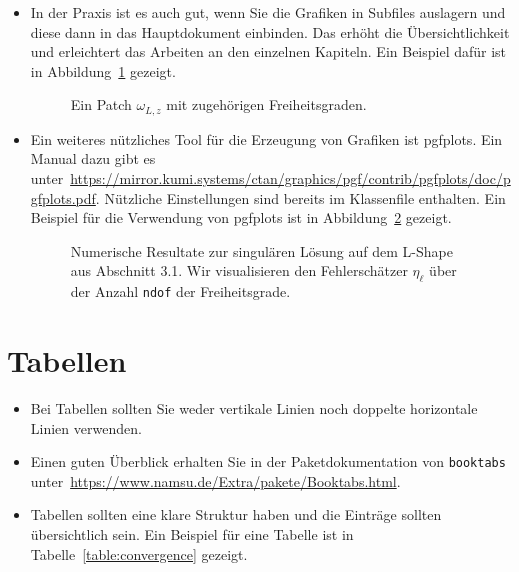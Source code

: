 \documentclass[../template_diplom.tex]{subfiles}
\begin{document}
\begin{itemize}
  \item In der Praxis ist es auch gut, wenn Sie die Grafiken in Subfiles auslagern und diese dann in das Hauptdokument einbinden. Das erhöht die Übersichtlichkeit und erleichtert das Arbeiten an den einzelnen Kapiteln. Ein Beispiel dafür ist in Abbildung~\ref{fig:patch} gezeigt.
        \begin{figure}
          \centering
          \begin{tikzpicture}
            
          \end{tikzpicture}
          \caption{Ein Patch $\omega_{L,z}$ mit zugehörigen Freiheitsgraden.}
          \label{fig:patch}
        \end{figure}

  \item Ein weiteres nützliches Tool für die Erzeugung von Grafiken ist pgfplots. Ein Manual dazu gibt es unter~\url{https://mirror.kumi.systems/ctan/graphics/pgf/contrib/pgfplots/doc/pgfplots.pdf}. Nützliche Einstellungen sind bereits im Klassenfile enthalten. Ein Beispiel für die Verwendung von pgfplots ist in Abbildung~\ref{fig:konvergenzplot} gezeigt.

        \begin{figure}
          \centering
          
          \caption{Numerische Resultate zur singulären Lösung auf dem
            L-Shape aus Abschnitt 3.1. Wir visualisieren den Fehlerschätzer $\eta_\ell$ über der
            Anzahl \texttt{ndof} der Freiheitsgrade.
          }
          \label{fig:konvergenzplot}
        \end{figure}
\end{itemize}

\section{Tabellen}
\begin{itemize}
  \item Bei Tabellen sollten Sie weder vertikale Linien noch doppelte horizontale Linien verwenden.
  \item Einen guten Überblick erhalten Sie in der Paketdokumentation von \verb$booktabs$ unter~\url{https://www.namsu.de/Extra/pakete/Booktabs.html}.
  \item Tabellen sollten eine klare Struktur haben und die Einträge sollten übersichtlich sein. Ein Beispiel für eine Tabelle ist in Tabelle~\ref{table:convergence} gezeigt.
  
  \begin{table}
    \centering
    
    \caption{Experimentelle Konvergenzraten des Fehlerschätzers aus Abschnitt~3.1.}
    \label{table:convergence}
  \end{table}
\end{itemize}
\end{document}
